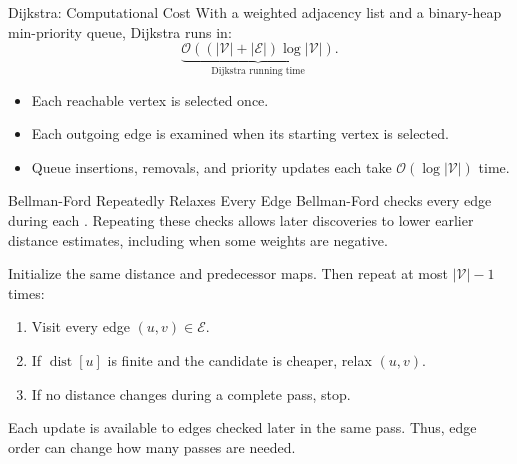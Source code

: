 \documentclass[aspectratio=169,11pt]{beamer}
\begin{document}
\begin{frame}{Dijkstra: Computational Cost}
  With a weighted adjacency list and a binary-heap min-priority queue,
  Dijkstra runs in:
  \[
    \underbrace{\mathcal O\!\left((|\mathcal V|+|\mathcal E|)
      \log|\mathcal V|\right)}_{\text{Dijkstra running time}}.
  \]

  \vspace{0.8em}
  \begin{itemize}\setlength{\itemsep}{0.75em}
    \item Each reachable vertex is selected once.
    \item Each outgoing edge is examined when its starting vertex is selected.
    \item Queue insertions, removals, and priority updates each take
      $\mathcal O(\log|\mathcal V|)$ time.
  \end{itemize}

\end{frame}

\begin{frame}{Bellman-Ford Repeatedly Relaxes Every Edge}
  Bellman-Ford checks every edge during each . Repeating these checks
  allows later discoveries to lower earlier distance estimates, including when
  some weights are negative.

  \vspace{0.7em}
  Initialize the same distance and predecessor maps. Then repeat at most
  $|\mathcal V|-1$ times:
  \begin{enumerate}\setlength{\itemsep}{0.55em}
    \item Visit every edge $(u,v)\in\mathcal E$.
    \item If $\operatorname{dist}[u]$ is finite and the candidate is cheaper,
      relax $(u,v)$.
    \item If no distance changes during a complete pass, stop.
  \end{enumerate}

  Each update is available to edges checked later in the same pass.
  Thus, edge order can change how many passes are needed.
\end{frame}
\end{document}
